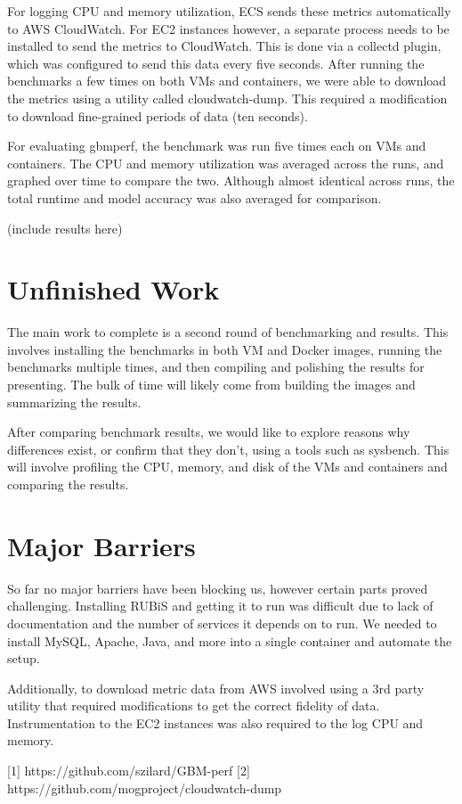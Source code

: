 \documentclass[11pt]{article}
\begin{document}
For logging CPU and memory utilization, ECS sends these metrics automatically to AWS CloudWatch. For EC2 instances however, a separate process needs to be installed to send the metrics to CloudWatch. This is done via a collectd plugin, which was configured to send this data every five seconds. After running the benchmarks a few times on both VMs and containers, we were able to download the metrics using a utility called cloudwatch-dump. This required a modification to download fine-grained periods of data (ten seconds).

For evaluating gbmperf, the benchmark was run five times each on VMs and containers. The CPU and memory utilization was averaged across the runs, and graphed over time to compare the two. Although almost identical across runs, the total runtime and model accuracy was also averaged for comparison.

(include results here)

\section{Unfinished Work}

The main work to complete is a second round of benchmarking and results. This involves installing the benchmarks in both VM and Docker images, running the benchmarks multiple times, and then compiling and polishing the results for presenting. The bulk of time will likely come from building the images and summarizing the results.

After comparing benchmark results, we would like to explore reasons why differences exist, or confirm that they don't, using a tools such as sysbench. This will involve profiling the CPU, memory, and disk of the VMs and containers and comparing the results.

\section{Major Barriers}

So far no major barriers have been blocking us, however certain parts proved challenging. Installing RUBiS and getting it to run was difficult due to lack of documentation and the number of services it depends on to run. We needed to install MySQL, Apache, Java, and more into a single container and automate the setup.

Additionally, to download metric data from AWS involved using a 3rd party utility that required modifications to get the correct fidelity of data. Instrumentation to the EC2 instances was also required to the log CPU and memory.

\hspace{16pt}

[1] https://github.com/szilard/GBM-perf
[2] https://github.com/mogproject/cloudwatch-dump
\end{document}
